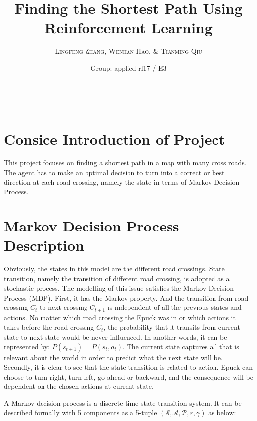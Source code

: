 \documentclass[a4paper, 11pt]{article} %
\title{\textbf{Finding the Shortest Path Using Reinforcement Learning}} %
\author{\textsc{Lingfeng Zhang, Wenhan Hao, $\&$ Tianming Qiu} %
\\{\textit{}}} %
\date{Group: applied-rl17 / E3} %
\makeatletter
\renewcommand{\maketitle}{ %
\begin{flushright} %
{\LARGE\@title} %

\vspace{50pt} %

{\large\@author} %
\\\@date %

\vspace{40pt} %
\end{flushright}
}
\makeatother
\begin{document}
\maketitle %




\section{Consice Introduction of Project}
This project focuses on finding a shortest path in a map with many cross roads. The agent has to make an optimal decision to turn into a correct or best direction at each road crossing, namely the state in terms of Markov Decision Process.


\section{Markov Decision Process Description}

Obviously, the states in this model are the different road crossings. State transition, namely the transition of different road crossing, is adopted as a stochastic process. The modelling of this issue satisfies the Markov Decision Process (MDP). 
First, it has the Markov property. And the transition from road crossing $C_{t}$ to next crossing $C_{t+1}$ is independent of all the previous states and actions. No matter which road crossing the Epuck was in or which actions it takes before the road crossing $C_{t}$, the probability that it transits from current state to next state would be never influenced. In another words, it can be represented by: $P(s_{t+1})=P(s_{t},a_{t})$. The current state captures all that is relevant about the world in order to predict what the next state will be.
Secondly, it is clear to see that the state transition is related to action. Epuck can choose to turn right, turn left, go ahead or backward, and the consequence will be dependent on the chosen actions at current state. 

A Markov decision process is a discrete-time state transition system. It can be described formally with 5 components as a 5-tuple $(\mathcal{S,A,P}, r,\gamma)$ as below:
\end{document}
